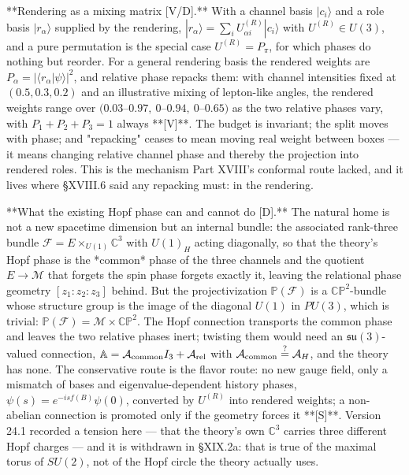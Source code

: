 **Rendering as a mixing matrix [V/D].** With a channel basis $|c_i\rangle$ and a role basis $|r_\alpha\rangle$ supplied by the rendering, $|r_\alpha\rangle = \sum_iU^{(R)}_{\alpha i}|c_i\rangle$ with $U^{(R)}\in U(3)$, and a pure permutation is the special case $U^{(R)} = P_\pi$, for which phases do nothing but reorder. For a general rendering basis the rendered weights are $P_\alpha = |\langle r_\alpha|\psi\rangle|^2$, and relative phase repacks them: with channel intensities fixed at $(0.5,0.3,0.2)$ and an illustrative mixing of lepton-like angles, the rendered weights range over $(0.03$–$0.97,\ 0$–$0.94,\ 0$–$0.65)$ as the two relative phases vary, with $P_1+P_2+P_3 = 1$ always **[V]**. The budget is invariant; the split moves with phase; and "repacking" ceases to mean moving real weight between boxes — it means changing relative channel phase and thereby the projection into rendered roles. This is the mechanism Part XVIII's conformal route lacked, and it lives where §XVIII.6 said any repacking must: in the rendering.

**What the existing Hopf phase can and cannot do [D].** The natural home is not a new spacetime dimension but an internal bundle: the associated rank-three bundle $\mathcal F = E\times_{U(1)}\mathbb C^3$ with $U(1)_H$ acting diagonally, so that the theory's Hopf phase is the *common* phase of the three channels and the quotient $E\to\mathcal M$ that forgets the spin phase forgets exactly it, leaving the relational phase geometry $[z_1:z_2:z_3]$ behind. But the projectivization $\mathbb P(\mathcal F)$ is a $\mathbb{CP}^2$-bundle whose structure group is the image of the diagonal $U(1)$ in $PU(3)$, which is trivial: $\mathbb P(\mathcal F) = \mathcal M\times\mathbb{CP}^2$. The Hopf connection transports the common phase and leaves the two relative phases inert; twisting them would need an $\mathfrak{su}(3)$-valued connection, $\mathbb A = \mathcal A_{\rm common}I_3+\mathcal A_{\rm rel}$ with $\mathcal A_{\rm common}\overset{?}{=}\mathcal A_H$, and the theory has none. The conservative route is the flavor route: no new gauge field, only a mismatch of bases and eigenvalue-dependent history phases, $\psi(s) = e^{-isf(B)}\psi(0)$, converted by $U^{(R)}$ into rendered weights; a non-abelian connection is promoted only if the geometry forces it **[S]**. Version 24.1 recorded a tension here — that the theory's own $\mathbb C^3$ carries three different Hopf charges — and it is withdrawn in §XIX.2a: that is true of the maximal torus of $SU(2)$, not of the Hopf circle the theory actually uses.

